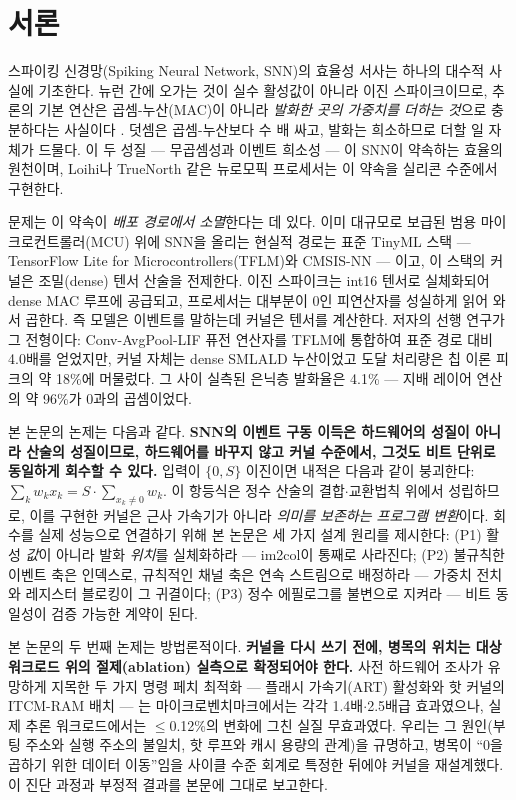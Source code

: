 \section{서론}\label{sec:intro}

스파이킹 신경망(Spiking Neural Network, SNN)의 효율성 서사는 하나의
대수적 사실에 기초한다. 뉴런 간에 오가는 것이 실수 활성값이 아니라
이진 스파이크이므로, 추론의 기본 연산은 곱셈-누산(MAC)이 아니라
\emph{발화한 곳의 가중치를 더하는 것}으로 충분하다는 사실이다
\cite{maass1997networks,roy2019towards}. 덧셈은 곱셈-누산보다 수 배
싸고\cite{horowitz2014computing}, 발화는 희소하므로 더할 일
자체가 드물다. 이 두 성질 --- 무곱셈성과 이벤트 희소성 --- 이 SNN이
약속하는 효율의 원천이며, Loihi나 TrueNorth 같은 뉴로모픽
프로세서는 이 약속을 실리콘 수준에서
구현한다\cite{davies2018loihi,merolla2014truenorth}.

문제는 이 약속이 \emph{배포 경로에서 소멸}한다는 데 있다. 이미
대규모로 보급된 범용 마이크로컨트롤러(MCU) 위에 SNN을 올리는 현실적
경로는 표준 TinyML 스택 --- TensorFlow Lite for
Microcontrollers(TFLM)\cite{david2021tflm}와
CMSIS-NN\cite{lai2018cmsisnn} --- 이고, 이 스택의 커널은 조밀(dense)
텐서 산술을 전제한다. 이진 스파이크는 int16 텐서로 실체화되어 dense
MAC 루프에 공급되고, 프로세서는 대부분이 0인 피연산자를 성실하게
읽어 와서 곱한다. 즉 모델은 이벤트를 말하는데 커널은 텐서를
계산한다. 저자의 선행 연구\cite{cha2026fusion}가 그 전형이다:
Conv-AvgPool-LIF 퓨전 연산자를 TFLM에 통합하여 표준 경로 대비 4.0배를
얻었지만, 커널 자체는 dense SMLALD 누산이었고 도달 처리량은 칩
이론 피크의 약 18\%에 머물렀다. 그 사이 실측된 은닉층 발화율은
4.1\% --- 지배 레이어 연산의 약 96\%가 0과의 곱셈이었다.

본 논문의 논제는 다음과 같다. \textbf{SNN의 이벤트 구동 이득은
하드웨어의 성질이 아니라 산술의 성질이므로, 하드웨어를 바꾸지 않고
커널 수준에서, 그것도 비트 단위로 동일하게 회수할 수 있다.} 입력이
$\{0, S\}$ 이진이면 내적은 다음과 같이 붕괴한다:
$\sum_k w_k x_k = S\cdot\sum_{x_k\neq0}w_k$. 이 항등식은 정수 산술의
결합$\cdot$교환법칙 위에서 성립하므로, 이를 구현한 커널은 근사
가속기가 아니라 \emph{의미를 보존하는 프로그램 변환}이다. 회수를
실제 성능으로 연결하기 위해 본 논문은 세 가지 설계 원리를 제시한다:
(P1) 활성 \emph{값}이 아니라 발화 \emph{위치}를 실체화하라 ---
im2col이 통째로 사라진다; (P2) 불규칙한 이벤트 축은 인덱스로,
규칙적인 채널 축은 연속 스트림으로 배정하라 --- 가중치 전치와
레지스터 블로킹이 그 귀결이다; (P3) 정수 에필로그를 불변으로 지켜라
--- 비트 동일성이 검증 가능한 계약이 된다.

본 논문의 두 번째 논제는 방법론적이다. \textbf{커널을 다시 쓰기
전에, 병목의 위치는 대상 워크로드 위의 절제(ablation) 실측으로
확정되어야 한다.} 사전 하드웨어 조사가 유망하게 지목한 두 가지 명령
페치 최적화 --- 플래시 가속기(ART) 활성화와 핫 커널의 ITCM-RAM 배치
--- 는 마이크로벤치마크에서는 각각 1.4배$\cdot$2.5배급 효과였으나,
실제 추론 워크로드에서는 $\le$0.12\%의 변화에 그친 실질 무효과였다.
우리는 그 원인(부팅 주소와 실행 주소의 불일치, 핫 루프와 캐시
용량의 관계)을 규명하고, 병목이 ``0을 곱하기 위한 데이터
이동''임을 사이클 수준 회계로 특정한 뒤에야 커널을 재설계했다.
이 진단 과정과 부정적 결과를 본문에 그대로 보고한다.

